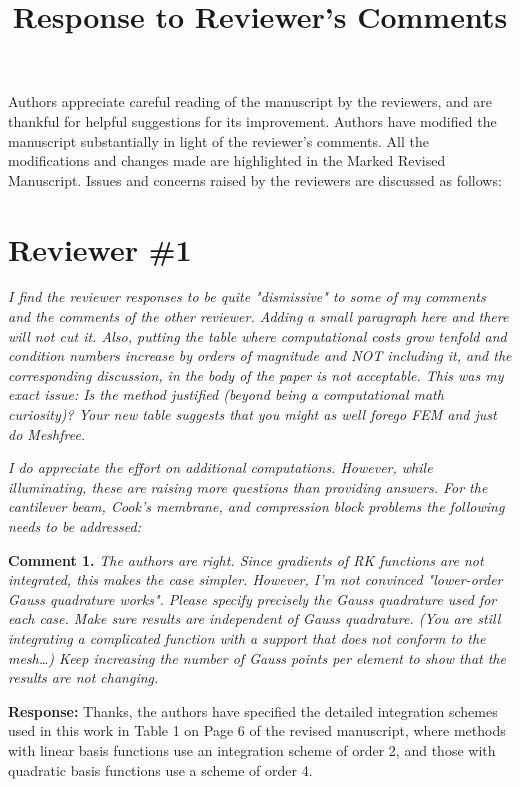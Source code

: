 \documentclass{article}
\title{Response to Reviewer's Comments}
\author{}
\date{}
\begin{document}
\maketitle

Authors appreciate careful reading of the manuscript by the reviewers, and are thankful for helpful suggestions for its improvement. Authors have modified the manuscript substantially in light of the reviewer's comments. All the modifications and changes made are highlighted in the Marked Revised Manuscript. Issues and concerns raised by the reviewers are discussed as follows:

\section*{Reviewer \#1}
\textit{I find the reviewer responses to be quite "dismissive" to some of my comments and the comments of the other reviewer. Adding a small paragraph here and there will not cut it. Also, putting the table where computational costs grow tenfold and condition numbers increase by orders of magnitude and NOT including it, and the corresponding discussion, in the body of the paper is not acceptable. This was my exact issue: Is the method justified (beyond being a computational math curiosity)? Your new table suggests that you might as well forego FEM and just do Meshfree.}

\textit{I do appreciate the effort on additional computations. However, while illuminating, these are raising more questions than providing answers. For the cantilever beam, Cook's membrane, and compression block problems the following needs to be addressed:}

\textbf{Comment 1.} \textit{The authors are right. Since gradients of RK functions are not integrated, this makes the case simpler. However, I'm not convinced "lower-order Gauss quadrature works". Please specify precisely the Gauss quadrature used for each case. Make sure results are independent of Gauss quadrature. (You are still integrating a complicated function with a support that does not conform to the mesh…) Keep increasing the number of Gauss points per element to show that the results are not changing.}

\textbf{Response:} 
Thanks, the authors have specified the detailed integration schemes used in this work in Table 1 on Page 6 of the revised manuscript, where methods with linear basis functions use an integration scheme of order 2, and those with quadratic basis functions use a scheme of order 4.
\end{document}
